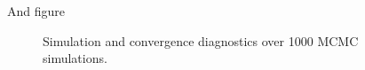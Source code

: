 \documentclass[article]{jss}
\begin{document}
\begin{table}[ht]
\begin{tabular}{lrrrrrr}
   \hline
\end{tabular}
\end{table}

And figure 


\begin{figure}[h]
  \caption{Simulation and convergence diagnostics over 1000 MCMC simulations.}
    \label{resultssim}
\end{figure}
\end{document}
